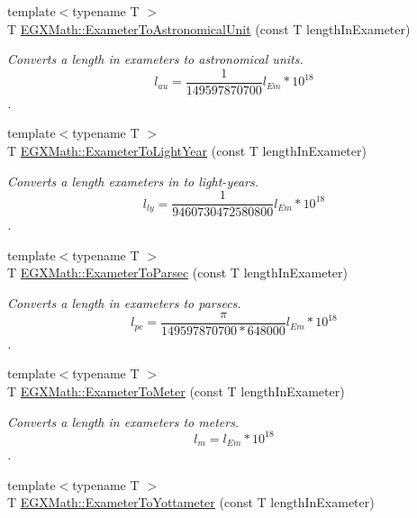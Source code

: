 \begin{DoxyCompactItemize}
\item 
{\footnotesize template$<$typename T $>$ }\\T \mbox{\hyperlink{group___e_g_x_math-_conversions-_length_conversions-_s_i-_exameter-_astronomical_gafe75957564bfe2508c37089fece97c41}{E\+G\+X\+Math\+::\+Exameter\+To\+Astronomical\+Unit}} (const T length\+In\+Exameter)
\begin{DoxyCompactList}\small\item\em Converts a length in exameters to astronomical units. \[ l_{au}= \frac{1}{149597870700} l_{Em} * 10^{18} \]. \end{DoxyCompactList}\item 
{\footnotesize template$<$typename T $>$ }\\T \mbox{\hyperlink{group___e_g_x_math-_conversions-_length_conversions-_s_i-_exameter-_astronomical_ga3867a3c149542e86e92d12147fd6d34e}{E\+G\+X\+Math\+::\+Exameter\+To\+Light\+Year}} (const T length\+In\+Exameter)
\begin{DoxyCompactList}\small\item\em Converts a length exameters in to light-\/years. \[ l_{ly}= \frac{1}{9460730472580800} l_{Em} * 10^{18} \]. \end{DoxyCompactList}\item 
{\footnotesize template$<$typename T $>$ }\\T \mbox{\hyperlink{group___e_g_x_math-_conversions-_length_conversions-_s_i-_exameter-_astronomical_ga807fef0b23d3c3c9b4a11c26bcd36b6e}{E\+G\+X\+Math\+::\+Exameter\+To\+Parsec}} (const T length\+In\+Exameter)
\begin{DoxyCompactList}\small\item\em Converts a length in exameters to parsecs. \[ l_{pc}=\frac{\pi}{149597870700 * 648000} l_{Em} * 10^{18} \]. \end{DoxyCompactList}\item 
{\footnotesize template$<$typename T $>$ }\\T \mbox{\hyperlink{group___e_g_x_math-_conversions-_length_conversions-_s_i-_exameter-_s_i_ga367c71c371f48790004a1de30a59f2a4}{E\+G\+X\+Math\+::\+Exameter\+To\+Meter}} (const T length\+In\+Exameter)
\begin{DoxyCompactList}\small\item\em Converts a length in exameters to meters. \[ l_{m}=l_{Em} * 10^{18} \]. \end{DoxyCompactList}\item 
{\footnotesize template$<$typename T $>$ }\\T \mbox{\hyperlink{group___e_g_x_math-_conversions-_length_conversions-_s_i-_exameter-_s_i_ga052b009f7705d8ad81083116d15dec65}{E\+G\+X\+Math\+::\+Exameter\+To\+Yottameter}} (const T length\+In\+Exameter)

\end{DoxyCompactItemize}

